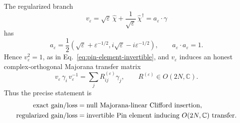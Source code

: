 \documentclass[aps,prb,onecolumn,nofootinbib,superscriptaddress]{revtex4-2}
\theoremstyle{plain}
\theoremstyle{definition}
\begin{document}
The regularized branch
\begin{equation}
  v_\varepsilon
  =
  \sqrt{\varepsilon}\,\hat\chi
  +
  \frac{1}{\sqrt{\varepsilon}}\,\hat\chi^\dagger
  =
  a_\varepsilon\cdot\gamma
  \label{eq:majorana-regularized-branch}
\end{equation}
has
\begin{equation}
  a_\varepsilon
  =
  \frac{1}{2}
  \left(
  \sqrt{\varepsilon}+\varepsilon^{-1/2},
  i\sqrt{\varepsilon}-i\varepsilon^{-1/2}
  \right),
  \qquad
  a_\varepsilon\cdot a_\varepsilon=1 .
  \label{eq:majorana-regularized-vector}
\end{equation}
Hence \(v_\varepsilon^2=1\), as in
Eq.~\eqref{eq:pin-element-invertible}, and \(v_\varepsilon\) induces an
honest complex-orthogonal Majorana transfer matrix
\begin{equation}
  v_\varepsilon\,\gamma_i\,v_\varepsilon^{-1}
  =
  \sum_j R_{ij}^{(\varepsilon)}\gamma_j,
  \qquad
  R^{(\varepsilon)}\in O(2N,\mathbb C).
  \label{eq:regularized-majorana-transfer}
\end{equation}
Thus the precise statement is
\begin{align}
  \hbox{exact gain/loss}
  &=
  \hbox{null Majorana-linear Clifford insertion},
  \nonumber\\
  \hbox{regularized gain/loss}
  &=
  \hbox{invertible Pin element inducing }O(2N,\mathbb C)\hbox{ transfer}.
  \label{eq:exact-versus-regularized-majorana}
\end{align}
\end{document}
